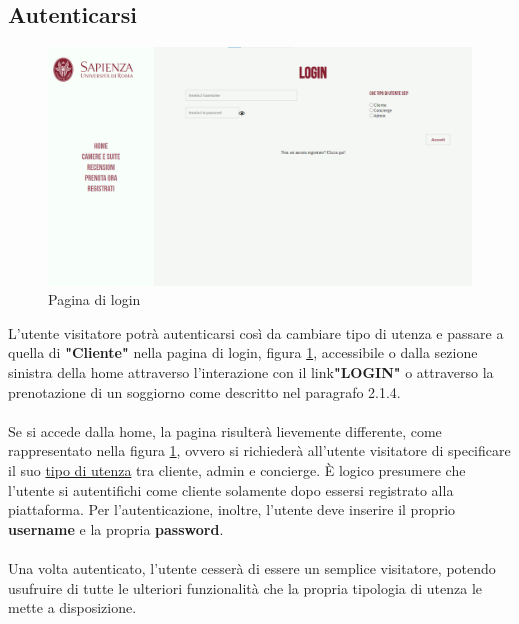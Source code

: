 \documentclass [a4paper, 12pt]{book}
\begin{document}
\subsection{Autenticarsi}
\begin{figure}[!ht]
\centering
\includegraphics[scale=0.3]{Login.png}
\caption{Pagina di login}
\label{LoginNormale}
\end{figure}
L'utente visitatore potrà autenticarsi così da cambiare tipo di utenza e passare a quella di \textbf{"Cliente"} nella pagina di login, figura \ref{LoginNormale}, accessibile o dalla sezione sinistra della home attraverso l'interazione con il link\pagebreak \textbf{"LOGIN"} o attraverso la prenotazione di un soggiorno come descritto nel paragrafo 2.1.4. \\\\
Se si accede dalla home, la pagina risulterà lievemente differente, come rappresentato nella figura \ref{LoginNormale}, ovvero si richiederà all’utente visitatore di specificare il suo \underline{tipo di utenza} tra cliente, admin e concierge. È logico presumere che l'utente si autentifichi come cliente solamente dopo essersi registrato alla piattaforma. Per l'autenticazione, inoltre, l'utente deve inserire il proprio \textbf{username} e la propria \textbf{password}.\\\\
Una volta autenticato, l'utente cesserà di essere un semplice visitatore, potendo usufruire di tutte le ulteriori funzionalità che la propria tipologia di utenza le mette a disposizione. 
\end{document}
